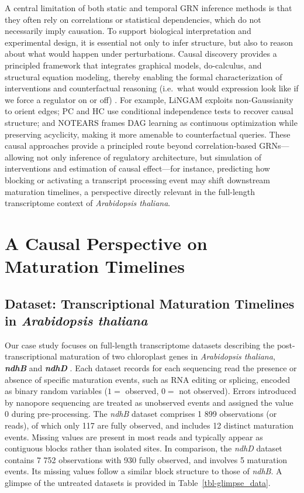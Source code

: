 \documentclass[
]{article}
\theoremstyle{definition}
\theoremstyle{remark}
\begin{document}
A central limitation of both static and temporal GRN inference methods
is that they often rely on correlations or statistical dependencies,
which do not necessarily imply causation. To support biological
interpretation and experimental design, it is essential not only to
infer structure, but also to reason about what would happen under
perturbations. Causal discovery provides a principled framework that
integrates graphical models, do-calculus, and structural equation
modeling, thereby enabling the formal characterization of interventions
and counterfactual reasoning (i.e.~what would expression look like if we
force a regulator on or off)
. For example, LiNGAM
exploits non-Gaussianity to orient edges; PC and HC use conditional
independence tests to recover causal structure; and NOTEARS
 frames DAG learning as continuous
optimization while preserving acyclicity, making it more amenable to
counterfactual queries. These causal approaches provide a principled
route beyond correlation-based GRNs---allowing not only inference of
regulatory architecture, but simulation of interventions and estimation
of causal effect---for instance, predicting how blocking or activating a
transcript processing event may shift downstream maturation timelines, a
perspective directly relevant in the full-length transcriptome context
of \emph{Arabidopsis thaliana}.

\section{A Causal Perspective on Maturation
Timelines}\label{sec-frameworks}

\subsection{\texorpdfstring{Dataset: Transcriptional Maturation
Timelines in \emph{Arabidopsis
thaliana}}{Dataset: Transcriptional Maturation Timelines in Arabidopsis thaliana}}\label{sec-dataset}

Our case study focuses on full-length transcriptome datasets describing
the post-transcriptional maturation of two chloroplast genes in
\emph{Arabidopsis thaliana}, \textbf{\emph{ndhB}} and
\textbf{\emph{ndhD}} .
Each dataset records for each sequencing read the presence or absence of
specific maturation events, such as RNA editing or splicing, encoded as
binary random variables (\(1 =\) observed, \(0 =\) not observed). Errors
introduced by nanopore sequencing are treated as unobserved events and
assigned the value \(0\) during pre-processing. The \emph{ndhB} dataset
comprises 1 899 observations (or reads), of which only 117 are fully
observed, and includes 12 distinct maturation events. Missing values are
present in most reads and typically appear as contiguous blocks rather
than isolated sites. In comparison, the \emph{ndhD} dataset contains 7
752 observations with 930 fully observed, and involves 5 maturation
events. Its missing values follow a similar block structure to those of
\emph{ndhB}. A glimpse of the untreated datasets is provided in
Table~\ref{tbl-glimpse_data}.
\end{document}
